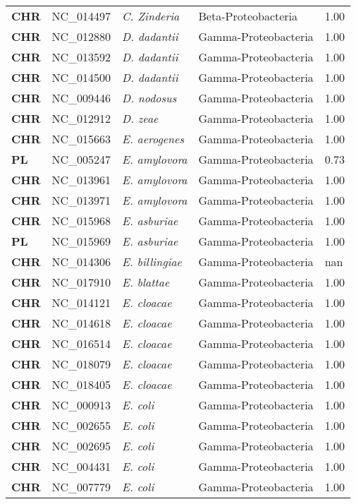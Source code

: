 \begin{adjustwidth}{-3cm}{2cm}
{\begin{supertabular}{>{\bfseries}l|p{0.1\textwidth}p{0.14\textwidth}l|l}
CHR & NC\_014497 & \textit{C. Zinderia} & Beta-Proteobacteria & 1.00\\
CHR & NC\_012880 & \textit{D. dadantii} & Gamma-Proteobacteria & 1.00\\
CHR & NC\_013592 & \textit{D. dadantii} & Gamma-Proteobacteria & 1.00\\
CHR & NC\_014500 & \textit{D. dadantii} & Gamma-Proteobacteria & 1.00\\
CHR & NC\_009446 & \textit{D. nodosus} & Gamma-Proteobacteria & 1.00\\
CHR & NC\_012912 & \textit{D. zeae} & Gamma-Proteobacteria & 1.00\\
CHR & NC\_015663 & \textit{E. aerogenes} & Gamma-Proteobacteria & 1.00\\
PL & NC\_005247 & \textit{E. amylovora} & Gamma-Proteobacteria & 0.73\\
CHR & NC\_013961 & \textit{E. amylovora} & Gamma-Proteobacteria & 1.00\\
CHR & NC\_013971 & \textit{E. amylovora} & Gamma-Proteobacteria & 1.00\\
CHR & NC\_015968 & \textit{E. asburiae} & Gamma-Proteobacteria & 1.00\\
PL & NC\_015969 & \textit{E. asburiae} & Gamma-Proteobacteria & 1.00\\
CHR & NC\_014306 & \textit{E. billingiae} & Gamma-Proteobacteria & nan\\
CHR & NC\_017910 & \textit{E. blattae} & Gamma-Proteobacteria & 1.00\\
CHR & NC\_014121 & \textit{E. cloacae} & Gamma-Proteobacteria & 1.00\\
CHR & NC\_014618 & \textit{E. cloacae} & Gamma-Proteobacteria & 1.00\\
CHR & NC\_016514 & \textit{E. cloacae} & Gamma-Proteobacteria & 1.00\\
CHR & NC\_018079 & \textit{E. cloacae} & Gamma-Proteobacteria & 1.00\\
CHR & NC\_018405 & \textit{E. cloacae} & Gamma-Proteobacteria & 1.00\\
CHR & NC\_000913 & \textit{E. coli} & Gamma-Proteobacteria & 1.00\\
CHR & NC\_002655 & \textit{E. coli} & Gamma-Proteobacteria & 1.00\\
CHR & NC\_002695 & \textit{E. coli} & Gamma-Proteobacteria & 1.00\\
CHR & NC\_004431 & \textit{E. coli} & Gamma-Proteobacteria & 1.00\\
CHR & NC\_007779 & \textit{E. coli} & Gamma-Proteobacteria & 1.00\\

\end{supertabular}}
\end{adjustwidth}
